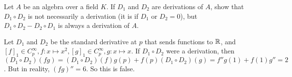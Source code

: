\begin{prob}
    Let $A$ be an algebra over a field $K$. If $D_1$ and $D_2$ are derivations of $A$, show that $D_1\circ D_2$ is not necessarily a derivation (it is if $D_1$ or $D_2=0$), but $D_1\circ D_2-D_2\circ D_1$ is always a derivation of $A$.    
\end{prob}
\begin{solution}
    Let $D_1$ and $D_2$ be the standard derivative at $p$ that sends functions to $\mathbb{R}$, and $[f]_1\in C_p^{\infty}, f \colon x \mapsto x^2, [g]_1\in C_p^{\infty}, g \colon x \mapsto x $. If $D_1\circ D_2$ were a derivation, then $(D_1\circ D_2)(fg)=(D_1\circ D_2)(f)g(p)+f(p)(D_1\circ D_2)(g)=f''g(1)+f(1)g''=2$. But in reality, $(fg)''=6$. So this is false.
\end{solution}

